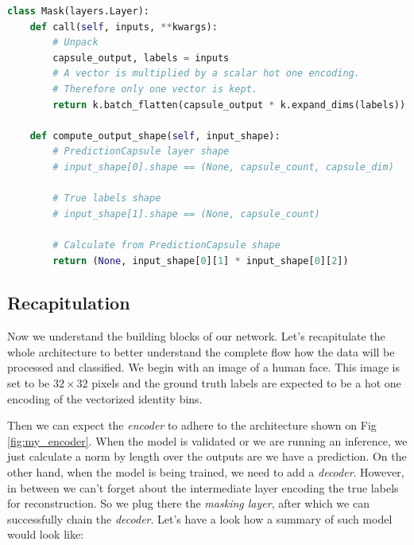 \begin{lstlisting}[language=Python, caption=Masking layer]
class Mask(layers.Layer):
    def call(self, inputs, **kwargs):
        # Unpack
        capsule_output, labels = inputs
        # A vector is multiplied by a scalar hot one encoding.
        # Therefore only one vector is kept.
        return k.batch_flatten(capsule_output * k.expand_dims(labels))

    def compute_output_shape(self, input_shape):
        # PredictionCapsule layer shape
        # input_shape[0].shape == (None, capsule_count, capsule_dim)

        # True labels shape
        # input_shape[1].shape == (None, capsule_count)

        # Calculate from PredictionCapsule shape
        return (None, input_shape[0][1] * input_shape[0][2])
\end{lstlisting}


\subsection{Recapitulation}

Now we understand the building blocks of our network. Let's recapitulate the whole architecture to better understand the complete flow how the data will be processed and classified. We begin with an image of a human face. This image is set to be $32\times32$ pixels and the ground truth labels are expected to be a hot one encoding of the vectorized identity bins.

Then we can expect the \textit{encoder} to adhere to the architecture shown on Fig\,\ref{fig:my_encoder}. When the model is validated or we are running an inference, we just calculate a norm by length over the outputs are we have a prediction. On the other hand, when the model is being trained, we need to add a \textit{decoder}. However, in between we can't forget about the intermediate layer encoding the true labels for reconstruction. So we plug there the \textit{masking layer}, after which we can successfully chain the \textit{decoder}. Let's have a look how a summary of such model would look like:

